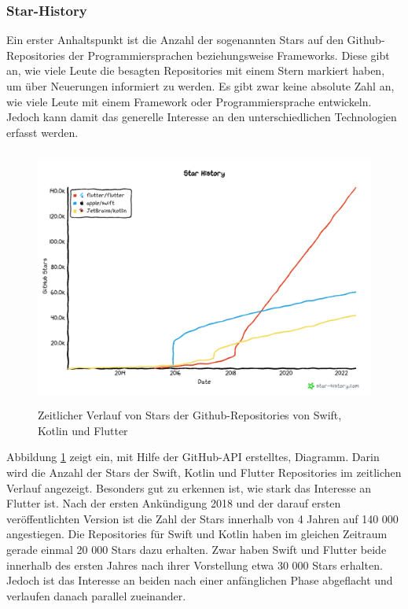 \subsubsection{Star-History}
Ein erster Anhaltspunkt ist die Anzahl der sogenannten Stars auf den Github-Repositories der Programmiersprachen beziehungsweise Frameworks. Diese gibt an, wie viele Leute die besagten Repositories mit einem Stern markiert haben, um über Neuerungen informiert zu werden. Es gibt zwar keine absolute Zahl an, wie viele Leute mit einem Framework oder Programmiersprache entwickeln. Jedoch kann damit das generelle Interesse an den unterschiedlichen Technologien erfasst werden.

\begin{figure}[ht]
  \centering
  \includegraphics[height=8.5cm,keepaspectratio]{images/star-history_programming languages.png} 
  \caption[Zeitlicher Verlauf von Stars der Github-Repositories von Swift, Kotlin und Flutter]{Zeitlicher Verlauf von Stars der Github-Repositories von Swift, Kotlin und Flutter\protect\footnotemark }
  \label{fig:star_history}
\end{figure}



Abbildung \ref{fig:star_history} zeigt ein, mit Hilfe der GitHub-API erstelltes, Diagramm. Darin wird die Anzahl der Stars der Swift, Kotlin und Flutter Repositories im zeitlichen Verlauf angezeigt. 
Besonders gut zu erkennen ist, wie stark das Interesse an Flutter ist. Nach der ersten Ankündigung 2018 und der darauf ersten veröffentlichten Version ist die Zahl der Stars innerhalb von 4 Jahren auf 140 000 angestiegen. Die Repositories für Swift und Kotlin haben im gleichen Zeitraum gerade einmal 20 000 Stars dazu erhalten. Zwar haben Swift und Flutter beide innerhalb des ersten Jahres nach ihrer Vorstellung etwa 30 000 Stars erhalten. Jedoch ist das Interesse an beiden nach einer anfänglichen Phase abgeflacht und verlaufen danach parallel zueinander.

